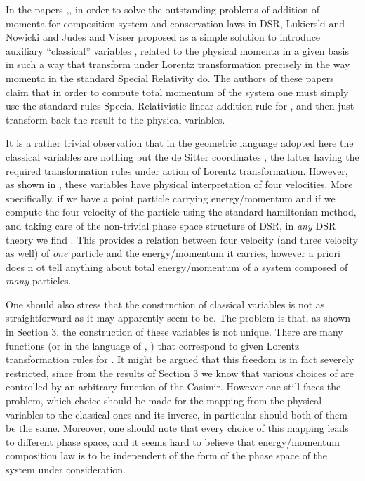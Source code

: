 \documentclass  [12pt] {article}
\begin{document}
In the papers \cite{lunoDSR},\cite{Judes:2002bw}, in order to solve the
outstanding problems of addition of momenta for composition system and
conservation laws in DSR, Lukierski and Nowicki and Judes and Visser proposed
as a simple solution to introduce auxiliary ``classical'' variables \coordHE{}, related to the physical momenta \coordHE{} in a given basis in such a way
that \coordHE{} transform under Lorentz transformation precisely in the way
momenta in the standard Special Relativity do. The authors of these papers
claim that in order to compute total momentum of the system one must simply use
the standard rules Special Relativistic linear addition rule for \coordHE{}, and then just transform back the result to the physical variables.

It is a rather trivial observation that in the geometric language adopted here
the classical variables are nothing but the de Sitter coordinates \myHighlight{$\eta_\mu$}\coordHE{},
the latter having the required transformation rules under action of Lorentz
transformation. However, as shown in \cite{JKM}, these variables have physical
interpretation of four velocities. More specifically, if we have a point
particle carrying energy/momentum \coordHE{} and if we compute the
four-velocity of the particle using the standard hamiltonian method, and taking
care of the non-trivial phase space structure of DSR, in {\em any} DSR theory
we find \coordHE{}. This provides a relation between four velocity (and
three velocity as well) of {\em one} particle and the energy/momentum it
carries, however a priori does n ot tell anything about total energy/momentum
of a system composed of {\em many} particles.

One should also stress that the construction of classical variables is not as
straightforward as it may apparently seem to be. The problem is that, as shown
in Section 3, the construction of these variables is not unique. There are many
functions \coordHE{} (or in the language of
\cite{lunoDSR},\cite{Judes:2002bw} \coordHE{}) that correspond to
given Lorentz transformation rules for \coordHE{}. It might be argued that this
freedom is in fact severely restricted, since from the results of Section 3 we
know that various choices of \coordHE{} are controlled by an arbitrary
function of the Casimir. However one still faces the problem, which choice
should be made for the mapping from the physical variables to the classical
ones and its inverse, in particular should both of them be the same. Moreover,
one should note that every choice of this mapping leads to different phase
space, and it seems hard to believe that energy/momentum composition law is to
be independent of the form of the phase space of the system under
consideration.
\end{document}
